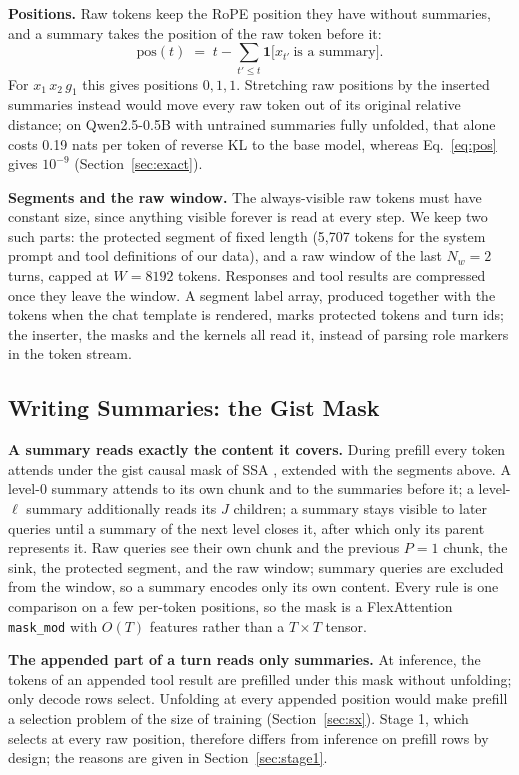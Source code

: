 \documentclass[10pt,twocolumn]{article}
\newcommand{\para}[1]{\noindent\textbf{#1}\hspace{0.5em}}
\begin{document}
\para{Positions.}
Raw tokens keep the RoPE position they have without summaries, and a summary takes the
position of the raw token before it:
\begin{equation}
  \mathrm{pos}(t) \;=\; t - \sum_{t' \le t} \mathbf{1}\bigl[x_{t'}\ \text{is a summary}\bigr].
  \label{eq:pos}
\end{equation}
For $x_1\,x_2\,g_1$ this gives positions $0,1,1$. Stretching raw positions by the inserted
summaries instead would move every raw token out of its original relative distance; on
Qwen2.5-0.5B with untrained summaries fully unfolded, that alone costs 0.19 nats per token of
reverse KL to the base model, whereas Eq.~\eqref{eq:pos} gives $10^{-9}$
(Section~\ref{sec:exact}).

\para{Segments and the raw window.}
The always-visible raw tokens must have constant size, since anything visible forever is read
at every step. We keep two such parts: the protected segment of fixed length (5,707 tokens
for the system prompt and tool definitions of our data), and a raw window of the last
$N_w=2$ turns, capped at $W=8192$ tokens. Responses and tool results are compressed once they
leave the window. A segment label array, produced together with the tokens when the chat
template is rendered, marks protected tokens and turn ids; the inserter, the masks and the
kernels all read it, instead of parsing role markers in the token stream.

\subsection{Writing Summaries: the Gist Mask}
\label{sec:mask}

\para{A summary reads exactly the content it covers.}
During prefill every token attends under the gist causal mask of SSA \citep{mao2026ssa},
extended with the segments above. A level-0 summary attends to its own chunk and to the
summaries before it; a level-$\ell$ summary additionally reads its $J$ children; a summary
stays visible to later queries until a summary of the next level closes it, after which only
its parent represents it. Raw queries see their own chunk and the previous $P=1$ chunk, the
sink, the protected segment, and the raw window; summary queries are excluded from the window,
so a summary encodes only its own content. Every rule is one comparison on a few per-token
positions, so the mask is a FlexAttention \texttt{mask\_mod} with $O(T)$ features rather than
a $T\times T$ tensor.

\para{The appended part of a turn reads only summaries.}
At inference, the tokens of an appended tool result are prefilled under this mask without
unfolding; only decode rows select. Unfolding at every appended position would make prefill a
selection problem of the size of training (Section~\ref{sec:sx}). Stage 1, which selects at
every raw position, therefore differs from inference on prefill rows by design; the reasons
are given in Section~\ref{sec:stage1}.
\end{document}
